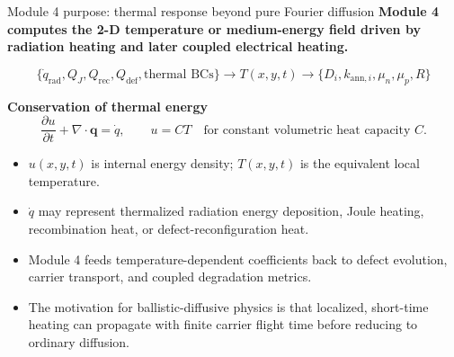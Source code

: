 \documentclass[aspectratio=169,10pt]{beamer}
\begin{document}
\begin{frame}{Module 4 purpose: thermal response beyond pure Fourier diffusion}
\small
\textbf{Module 4 computes the 2-D temperature or medium-energy field driven by radiation heating and later coupled electrical heating.}

\vspace{0.25em}
\begin{equation*}
\boxed{
\{\dot q_{\mathrm{rad}},Q_J,Q_{\mathrm{rec}},Q_{\mathrm{def}},\text{thermal BCs}\}
\longrightarrow
T(x,y,t)
\longrightarrow
\{D_i,k_{\mathrm{ann},i},\mu_n,\mu_p,R\}
}
\end{equation*}

\vspace{0.2em}
\textbf{Conservation of thermal energy}
\vspace{-0.25em}
\begin{equation*}
\frac{\partial u}{\partial t}+\nabla\cdot \mathbf q = \dot q,
\qquad
u=C T\quad\text{for constant volumetric heat capacity }C.
\end{equation*}

\vspace{-0.1em}
\begin{itemize}
    \item $u(x,y,t)$ is internal energy density; $T(x,y,t)$ is the equivalent local temperature.
    \item $\dot q$ may represent thermalized radiation energy deposition, Joule heating, recombination heat, or defect-reconfiguration heat.
    \item Module 4 feeds temperature-dependent coefficients back to defect evolution, carrier transport, and coupled degradation metrics.
    \item The motivation for ballistic-diffusive physics is that localized, short-time heating can propagate with finite carrier flight time before reducing to ordinary diffusion.
\end{itemize}
\end{frame}
\end{document}
